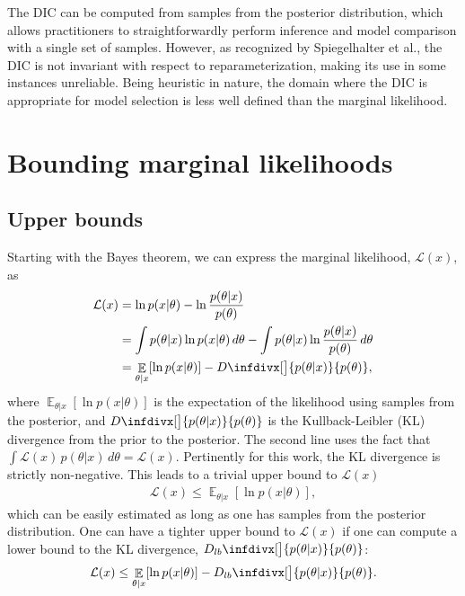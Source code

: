 \documentclass{article}
\DeclareMathOperator{\Ex}{\mathbb{E}}%
\newcommand{\infdiv}{D\infdivx}
\newcommand{\infdivlb}{D_{lb}\infdivx}
\begin{document}
The DIC can be computed from samples from the posterior distribution, which allows practitioners to straightforwardly perform inference and model comparison with a single set of samples. However, as recognized by Spiegelhalter et al., the DIC is not invariant with respect to reparameterization, making its use in some instances unreliable. Being heuristic in nature, the domain where the DIC is appropriate for model selection is less well defined than the marginal likelihood.

\section{Bounding marginal likelihoods}
\subsection{Upper bounds}
Starting with the Bayes theorem, we can express the marginal likelihood, $\mathcal{L}(x)$, as
\begin{align}
\mathcal{L}(x) &= \ln p(x | \theta) - \ln \frac{p(\theta | x)}{p(\theta)} \label{eq:logmarglike} \\
&= \int   p(\theta|x) \ln p(x | \theta)  \, d\theta  -  \int p(\theta|x) \ln \frac{p(\theta | x)}{p(\theta)}  \, d\theta  \notag\\
&=\Ex_{\theta | x} [ \ln  p(x|\theta)]  -  \infdiv[\big]{p(\theta | x)}{p(\theta)},
\label{eq:marg_up}
\end{align}
where $\Ex_{\theta | x} [ \ln  p(x|\theta)]$ is the expectation of the likelihood using samples from the posterior, and $\infdiv[\big]{p(\theta | x)}{p(\theta)}$ is the Kullback-Leibler (KL) divergence from the prior to the posterior. The second line uses the fact that $\int \mathcal{L}(x) \, p(\theta|x) \, d\theta = \mathcal{L}(x)$. Pertinently for this work, the KL divergence is strictly non-negative. This leads to a trivial upper bound to $\mathcal{L}(x)$
\begin{align}
\mathcal{L}(x) \leq \Ex_{\theta | x} [ \ln  p(x|\theta)],
\label{eq:ub_post_like}
\end{align}
which can be easily estimated as long as one has samples from the posterior distribution. One can have a tighter upper bound to $\mathcal{L}(x)$ if one can compute a lower bound to the KL divergence, $\infdivlb[\big]{p(\theta | x)}{p(\theta)}$:
\begin{align}
\mathcal{L}(x) \leq \Ex_{\theta | x} [ \ln  p(x|\theta)] -  \infdivlb[\big]{p(\theta | x)}{p(\theta)}.
\end{align}
\end{document}
